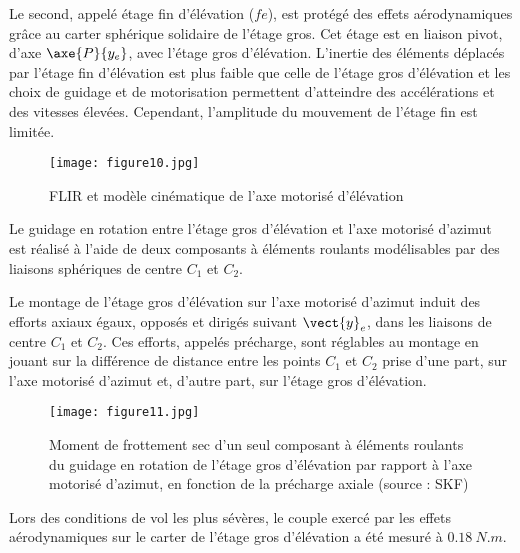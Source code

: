 Le second, appelé étage fin d'élévation ($fe$), est protégé
des effets aérodynamiques grâce au carter sphérique
solidaire de l'étage gros. Cet étage est en liaison pivot,
d'axe $\axe{P}{{y_e}}$, avec l'étage gros d'élévation. L'inertie des
éléments déplacés par l'étage fin d'élévation est plus faible
que celle de l'étage gros d'élévation et les choix de guidage
et de motorisation permettent d'atteindre des accélérations
et des vitesses élevées. Cependant, l'amplitude du mouvement de l'étage fin est limitée.

\begin{figure}[!htb]
\begin{center}
\texttt{[image: figure10.jpg]}
\caption{FLIR et modèle cinématique de l'axe motorisé d'élévation \label{figure10}}
\end{center}
\end{figure}

Le guidage en rotation entre l'étage gros d'élévation et l'axe motorisé d'azimut est réalisé à l'aide de deux
composants à éléments roulants modélisables par des liaisons sphériques de centre $C_1$ et $C_2$.


Le montage de l'étage gros d'élévation sur l'axe motorisé
d'azimut induit des efforts axiaux égaux, opposés
et dirigés suivant $\vect{y}_e$, dans les liaisons de centre
$C_1$ et $C_2$. Ces efforts, appelés précharge, sont réglables
au montage en jouant sur la différence de distance
entre les points $C_1$ et $C_2$ prise d'une part, sur
l'axe motorisé d'azimut et, d'autre part, sur l'étage
gros d'élévation.


\begin{figure}[h]
\begin{center}
\texttt{[image: figure11.jpg]}
\caption{Moment de frottement sec d'un seul composant à éléments roulants du guidage en rotation de l'étage
gros d'élévation par rapport à l'axe motorisé d'azimut, en fonction de la précharge axiale (source : SKF)\label{fig11}}
\end{center}
\end{figure}

Lors des conditions de vol les plus sévères, le couple exercé par les effets aérodynamiques sur le carter de l'étage
gros d'élévation a été mesuré à $\SI{0,18}{N.m}$.

